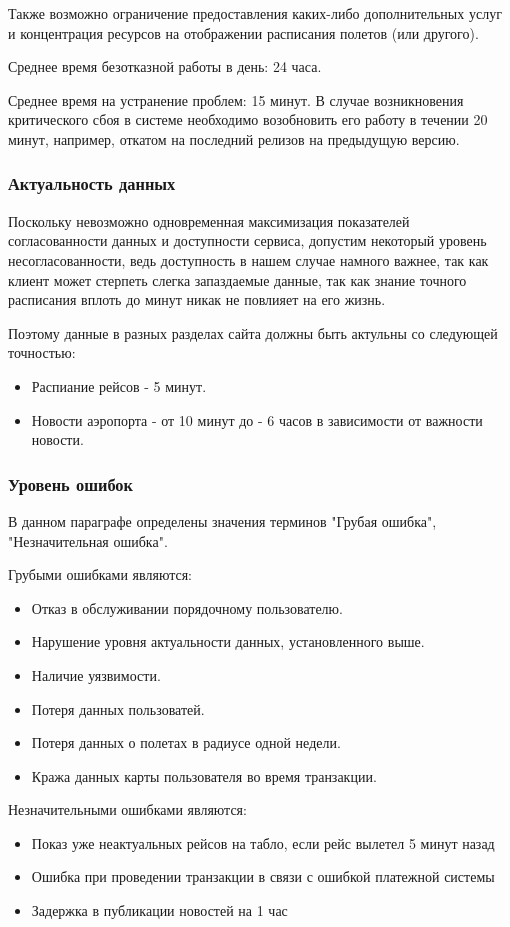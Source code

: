 Также возможно ограничение предоставления каких-либо
дополнительных услуг и концентрация ресурсов на
отображении расписания полетов (или другого).

Среднее время безотказной работы в день: 24 часа.

Среднее время на устранение проблем: 15 минут.
В случае возникновения критического сбоя в системе
необходимо возобновить его работу в течении 20 минут,
например, откатом на последний релизов на
предыдущую версию.

\subsubsection{Актуальность данных}

Поскольку невозможно одновременная максимизация
показателей согласованности данных и доступности
сервиса, допустим некоторый уровень несогласованности,
ведь доступность в нашем случае намного важнее,
так как клиент может стерпеть слегка запаздаемые
данные, так как знание точного расписания вплоть до
минут никак не повлияет на его жизнь.

Поэтому данные в разных разделах сайта должны
быть актульны со следующей точностью:
\begin{itemize}
      \item Распиание рейсов - 5 минут.
      \item Новости аэропорта - от 10 минут
            до - 6 часов в зависимости от
            важности новости.
\end{itemize}

\subsubsection{Уровень ошибок}

В данном параграфе определены значения терминов
"Грубая ошибка", "Незначительная ошибка".

Грубыми ошибками являются:
\begin{itemize}
      \item Отказ в обслуживании
            порядочному пользователю.
      \item Нарушение уровня актуальности данных,
            установленного выше.
      \item Наличие уязвимости.
      \item Потеря данных пользоватей.
      \item Потеря данных о полетах
            в радиусе одной недели.
      \item Кража данных карты пользователя во время
            транзакции.
\end{itemize}

Незначительными ошибками являются:
\begin{itemize}
      \item Показ уже неактуальных рейсов на табло,
            если рейс вылетел 5 минут назад
      \item Ошибка при проведении транзакции в связи
            с ошибкой платежной системы
      \item Задержка в публикации новостей на 1 час
\end{itemize}
